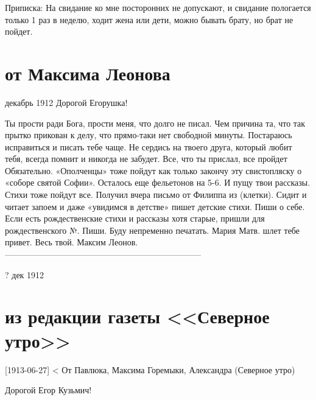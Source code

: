 \documentclass[]{memoir}
\begin{document}
Приписка: 
На свидание ко мне посторонних не допускают, и свидание пологается только 1 раз в неделю, ходит жена или дети, можно бывать брату, но брат не пойдет.



\section{от Максима Леонова}
декабрь 1912
Дорогой Егорушка!

Ты прости ради Бога, прости меня, что долго не писал.
Чем причина та, что так прытко прикован к делу, что прямо-таки нет свободной минуты. Постараюсь исправиться и писать тебе чаще. Не сердись на твоего друга, который любит тебя, всегда помнит и никогда не забудет. Все, что ты прислал, все пройдет Обязательно. «Ополченцы» тоже пойдут как только закончу  эту свистопляску о «соборе святой Софии». Осталось еще фельетонов на 5-6. И пущу твои рассказы. Стихи тоже пойдут все.  Получил вчера письмо от Филиппа из (клетки).  Сидит и читает запоем и даже «увидимся в детстве» пишет детские стихи. Пиши о себе.
Если есть рождественские стихи и рассказы хотя старые, пришли для рождественского №. Пиши. Буду непременно печатать.  Мария Матв. шлет тебе привет.
           Весь твой. Максим Леонов.
--------------------------------------------------------------------- 
 
? дек 1912

\section{из редакции газеты <<Северное утро>>}
[1913-06-27] < От Павлюка, Максима Горемыки, Александра (Северное утро)

Дорогой 
Егор Кузьмич!
\end{document}
